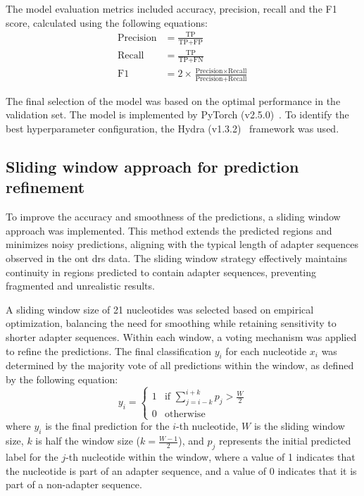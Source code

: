 \documentclass[pdflatex,sn-nature, lineno]{sn-jnl}%
\begin{document}
The model evaluation metrics included accuracy, precision, recall and the F1 score, calculated using the following equations:
\begin{align*}
	\textrm{Precision} & = \frac{\textrm{TP}}{\textrm{TP}+\textrm{FP}}                                                     \\
	\textrm{Recall}    & = \frac{\textrm{TP}}{\textrm{TP}+\textrm{FN}}                                                     \\
	\textrm{F1}        & = 2 \times \frac{\textrm{Precision} \times \textrm{Recall}}{\textrm{Precision} + \textrm{Recall}}
\end{align*}

The final selection of the model was based on the optimal performance in the validation set.
The model is implemented by PyTorch (v2.5.0)~\cite{paszke2019pytorch}.
To identify the best hyperparameter configuration, the Hydra (v1.3.2)~\cite{Yadan2019Hydra} framework was used.

\subsection{Sliding window approach for prediction refinement}

To improve the accuracy and smoothness of the predictions, a sliding window approach was implemented.
This method extends the predicted regions and minimizes noisy predictions, aligning with the typical length of adapter sequences observed in the \gls{ont} \gls{drs} data.
The sliding window strategy effectively maintains continuity in regions predicted to contain adapter sequences, preventing fragmented and unrealistic results.

A sliding window size of 21 nucleotides was selected based on empirical optimization, balancing the need for smoothing while retaining sensitivity to shorter adapter sequences.
Within each window, a voting mechanism was applied to refine the predictions.
The final classification $y_i$ for each nucleotide \( x_i \) was determined by the majority vote of all predictions within the window, as defined by the following equation:
\[
	y_i = \begin{cases}
		1 & \text{if } \sum_{j=i-k}^{i+k} p_j > \frac{W}{2} \\
		0 & \text{otherwise}
	\end{cases}
\]
where \(y_i\) is the final prediction for the $i$-th nucleotide, \( W \) is the sliding window size, \( k \) is half the window size (\( k = \frac{W-1}{2}\)), and  \(p_j\) represents the initial predicted label for the \(j\)-th nucleotide within the window, where a value of 1 indicates that the nucleotide is part of an adapter sequence, and a value of 0 indicates that it is part of a non-adapter sequence.
\end{document}
